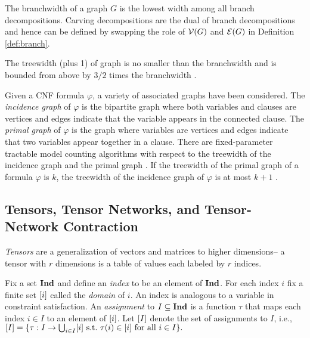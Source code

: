 The branchwidth of a graph $G$ is the lowest width among all branch decompositions. Carving decompositions are the dual of branch decompositions and hence can be defined by swapping the role of $\mathcal{V}(G)$ and $\mathcal{E}(G)$ in Definition \ref{def:branch}.

The treewidth (plus 1) of graph is no smaller than the branchwidth and is bounded from above by $3/2$ times the branchwidth \cite{RS91}. 

Given a CNF formula $\varphi$, a variety of associated graphs have been considered. The \emph{incidence graph} of $\varphi$ is the bipartite graph where both variables and clauses are vertices and edges indicate that the variable appears in the connected clause. The \emph{primal graph} of $\varphi$ is the graph where variables are vertices and edges indicate that two variables appear together in a clause. There are fixed-parameter tractable model counting algorithms with respect to the treewidth of the incidence graph and the primal graph \cite{SS10}. If the treewidth of the primal graph of a formula $\varphi$ is $k$, the treewidth of the incidence graph of $\varphi$ is at most $k+1$ \cite{KV00}.
 


\subsection{Tensors, Tensor Networks, and Tensor-Network Contraction}
\emph{Tensors} are a generalization of vectors and matrices to higher dimensions-- a tensor with $r$ dimensions is a table of values each labeled by $r$ indices. 

Fix a set $\mathbf{Ind}$ and define an \emph{index} to be an element of $\mathbf{Ind}$. For each index $i$ fix a finite set $[i]$ called the \emph{domain} of $i$. An index is analogous to a variable in constraint satisfaction. %
An \emph{assignment} to $I \subseteq \mathbf{Ind}$ is a function $\tau$ that maps each index $i \in I$ to an element of $[i]$. Let $[I]$ denote the set of assignments to $I$, i.e., $[I] = \{\tau: I \rightarrow \bigcup_{i \in I} [i]~\text{s.t.}~\tau(i) \in [i]~\text{for all}~i \in I\}.$

